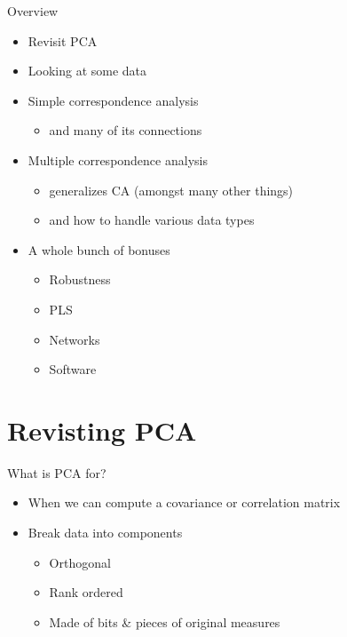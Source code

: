 \documentclass[
  ignorenonframetext,
]{beamer}
\providecommand{\tightlist}{%
  \setlength{\itemsep}{0pt}\setlength{\parskip}{0pt}}
\begin{document}
\begin{frame}{Overview}
\protect\hypertarget{overview}{}

\begin{itemize}[<+->]
\tightlist
\item
  Revisit PCA
\item
  Looking at some data
\item
  Simple correspondence analysis

  \begin{itemize}[<+->]
  \tightlist
  \item
    and many of its connections
  \end{itemize}
\item
  Multiple correspondence analysis

  \begin{itemize}[<+->]
  \tightlist
  \item
    generalizes CA (amongst many other things)
  \item
    and how to handle various data types
  \end{itemize}
\item
  A whole bunch of bonuses

  \begin{itemize}[<+->]
  \tightlist
  \item
    Robustness
  \item
    PLS
  \item
    Networks
  \item
    Software
  \end{itemize}
\end{itemize}

\end{frame}

\hypertarget{revisting-pca}{%
\section{Revisting PCA}\label{revisting-pca}}

\begin{frame}{What is PCA for?}
\protect\hypertarget{what-is-pca-for}{}

\begin{itemize}[<+->]
\tightlist
\item
  When we can compute a covariance or correlation matrix
\item
  Break data into components

  \begin{itemize}[<+->]
  \tightlist
  \item
    Orthogonal
  \item
    Rank ordered
  \item
    Made of bits \& pieces of original measures
  \end{itemize}
\end{itemize}

\end{frame}
\end{document}
